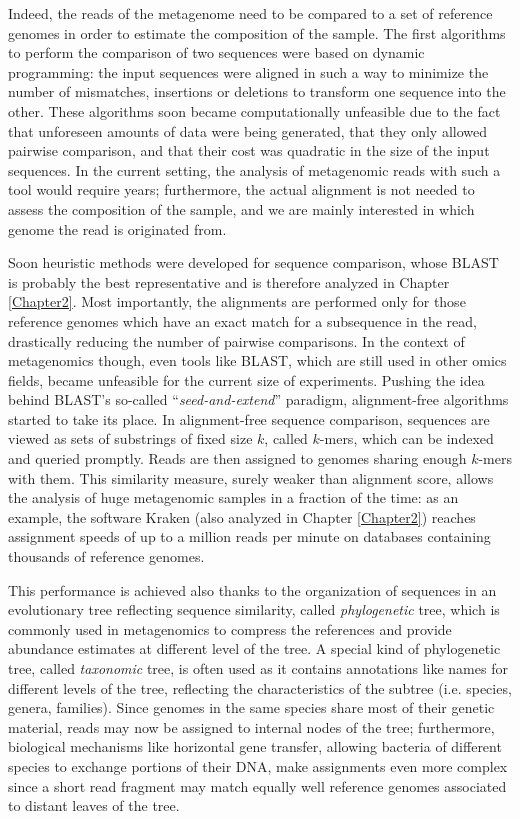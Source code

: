 Indeed, the reads of the metagenome need to be compared to a set of reference genomes in order to estimate the composition of the sample. The first algorithms to perform the comparison of two sequences were based on dynamic programming: the input sequences were aligned in such a way to minimize the number of mismatches, insertions or deletions to transform one sequence into the other. These algorithms soon became computationally unfeasible due to the fact that unforeseen amounts of data were being generated, that they only allowed pairwise comparison, and that their cost was quadratic in the size of the input sequences. In the current setting, the analysis of metagenomic reads with such a tool would require years; furthermore, the actual alignment is not needed to assess the composition of the sample, and we are mainly interested in which genome the read is originated from.

Soon heuristic methods were developed for sequence comparison, whose BLAST is probably the best representative and is therefore analyzed in Chapter \ref{Chapter2}. Most importantly, the alignments are performed only for those reference genomes which have an exact match for a subsequence in the read, drastically reducing the number of pairwise comparisons. In the context of metagenomics though, even tools like BLAST, which are still used in other omics fields, became unfeasible for the current size of experiments. Pushing the idea behind BLAST's so-called ``\textit{seed-and-extend}'' paradigm, alignment-free algorithms started to take its place. In alignment-free sequence comparison, sequences are viewed as sets of substrings of fixed size $k$, called $k$-mers, which can be indexed and queried promptly. Reads are then assigned to genomes sharing enough $k$-mers with them. This similarity measure, surely weaker than alignment score, allows the analysis of huge metagenomic samples in a fraction of the time: as an example, the software Kraken (also analyzed in Chapter \ref{Chapter2}) reaches assignment speeds of up to a million reads per minute on databases containing thousands of reference genomes.

This performance is achieved also thanks to the organization of sequences in an evolutionary tree reflecting sequence similarity, called \textit{phylogenetic} tree, which is commonly used in metagenomics to compress the references and provide abundance estimates at different level of the tree. A special kind of phylogenetic tree, called \textit{taxonomic} tree, is often used as it contains annotations like names for different levels of the tree, reflecting the characteristics of the subtree (i.e. species, genera, families). Since genomes in the same species share most of their genetic material, reads may now be assigned to internal nodes of the tree; furthermore, biological mechanisms like horizontal gene transfer, allowing bacteria of different species to exchange portions of their DNA, make assignments even more complex since a short read fragment may match equally well reference genomes associated to distant leaves of the tree.

